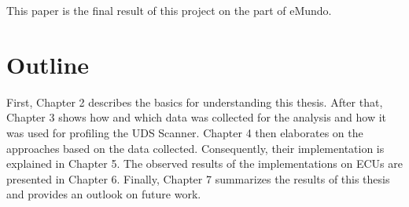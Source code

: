 This paper is the final result of this project on the part of eMundo.

\section{Outline}

First, Chapter 2 describes the basics for understanding this thesis. After that, Chapter 3 shows how and which data was collected for the analysis and how it was used for profiling the UDS Scanner. Chapter 4 then elaborates on the approaches based on the data collected. Consequently, their implementation is explained in Chapter 5. The observed results of the implementations on ECUs are presented in Chapter 6. Finally, Chapter 7 summarizes the results of this thesis and provides an outlook on future work.
